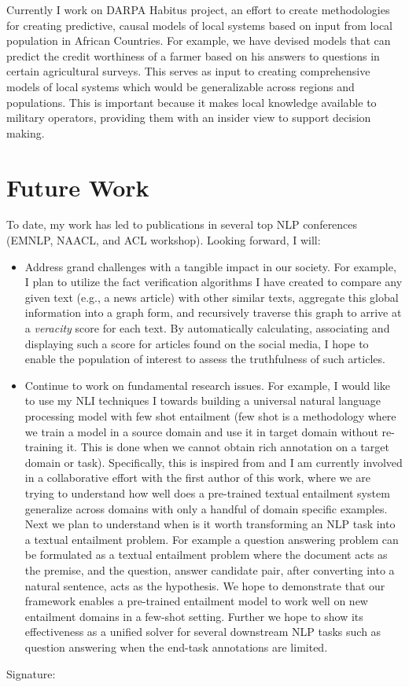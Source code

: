 \documentclass[10pt]{article}
\begin{document}
Currently I work on DARPA Habitus project, an effort to create methodologies for creating predictive, causal models of local systems based on input from local population in African Countries. For example, we have devised models that can predict the credit worthiness of a farmer based on his answers to questions in certain agricultural surveys. This serves as input to creating
comprehensive models of local systems which would be generalizable across regions and populations. This is important because it makes local knowledge available to military operators, providing them with an insider view to support decision making.
\section*{Future Work}
To date, my work has led to publications in several top NLP conferences (EMNLP, NAACL, and ACL workshop). Looking forward, I will:
\begin{itemize}
\item Address grand challenges with a tangible impact in our society. For example, I plan to utilize the fact verification algorithms I have created to compare any given text (e.g., a news article) with other similar texts, aggregate this global information into a graph form, and recursively traverse this graph to arrive at a \textit{veracity} score for each text. By automatically calculating, associating and displaying such a score for articles found on the social media, I hope to enable the population of interest to assess the truthfulness of such articles.

\item Continue to work on fundamental research issues. For example, I would like to use my NLI techniques I towards building a universal natural language processing model with few shot entailment (few shot is a methodology where we train a model in a source domain and use it in target domain without re-training it. This is done when we cannot obtain rich annotation on a target domain or task). 
Specifically, this is inspired from \cite{yin2020universal} and I am currently involved in a collaborative effort with the first author of this work, where we are trying to understand how well does a pre-trained textual entailment system generalize across domains with only a handful of domain specific examples. Next we plan to understand when is it worth transforming an NLP task into a textual entailment problem. For example a question answering problem can be formulated as a textual entailment problem where the document acts as the premise, and the question, answer
candidate pair, after converting into a natural sentence,
acts as the hypothesis. We hope to demonstrate that our framework enables a pre-trained entailment model to work well on new entailment domains in a few-shot setting. Further we hope to show its effectiveness as a unified solver for several downstream NLP tasks such as question answering  when the end-task annotations are limited.

\end{itemize}

{\flushleft Signature:}
\bigskip
\bigskip


\end{document}
